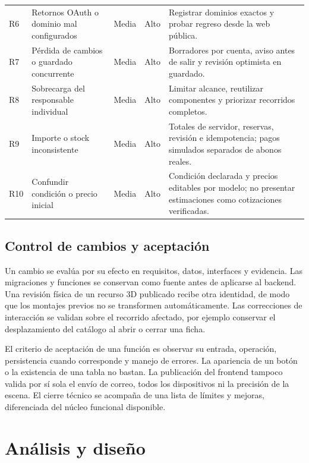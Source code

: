 \documentclass[12pt,letterpaper]{article}
\newcommand{\pagina}{\clearpage}
\newenvironment{tabla}{\par\begingroup\normalsize\singlespacing\setlength{\tabcolsep}{5pt}\renewcommand{\arraystretch}{1.25}}{\par\endgroup}
\begin{document}
\begin{tabla}
\begin{longtable}{L{.7cm}L{3.1cm}L{1.2cm}L{1.4cm}L{5.8cm}}
R6 & Retornos OAuth o dominio mal configurados & Media & Alto & Registrar dominios exactos y probar regreso desde la web pública.\\
R7 & Pérdida de cambios o guardado concurrente & Media & Alto & Borradores por cuenta, aviso antes de salir y revisión optimista en guardado.\\
R8 & Sobrecarga del responsable individual & Media & Alto & Limitar alcance, reutilizar componentes y priorizar recorridos completos.\\
R9 & Importe o stock inconsistente & Media & Alto & Totales de servidor, reservas, revisión e idempotencia; pagos simulados separados de abonos reales.\\
R10 & Confundir condición o precio inicial & Media & Alto & Condición declarada y precios editables por modelo; no presentar estimaciones como cotizaciones verificadas.\\\bottomrule
\end{longtable}\end{tabla}

\subsection{Control de cambios y aceptación}
Un cambio se evalúa por su efecto en requisitos, datos, interfaces y evidencia. Las migraciones y funciones se conservan como fuente antes de aplicarse al backend. Una revisión física de un recurso 3D publicado recibe otra identidad, de modo que los montajes previos no se transformen automáticamente. Las correcciones de interacción se validan sobre el recorrido afectado, por ejemplo conservar el desplazamiento del catálogo al abrir o cerrar una ficha.

El criterio de aceptación de una función es observar su entrada, operación, persistencia cuando corresponde y manejo de errores. La apariencia de un botón o la existencia de una tabla no bastan. La publicación del frontend tampoco valida por sí sola el envío de correo, todos los dispositivos ni la precisión de la escena. El cierre técnico se acompaña de una lista de límites y mejoras, diferenciada del núcleo funcional disponible.


\pagina

\section{Análisis y diseño}
\end{document}
